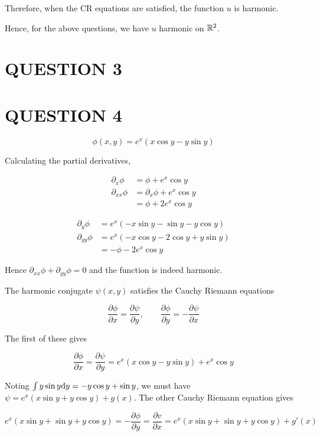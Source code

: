\documentclass[a4paper]{article}
\begin{document}
Therefore, when the CR equations are satisfied, the function $ u $ is harmonic.

Hence, for the above questions, we have $ u $ harmonic on $ \mathbb{R}^{2} $.


\section{QUESTION 3}
\section{QUESTION 4}

\[ \phi(x,y) = e^{x}(x \cos y - y \sin y) \]

Calculating the partial derivatives,

\begin{align*}
\partial_{x} \phi & = \phi + e^{x}\cos y \\
\partial_{xx} \phi & = \partial_{x} \phi +  e^{x}\cos y  \\
& = \phi + 2 e^{x}\cos y
\end{align*}



\begin{align*}
\partial_{y} \phi & = e^{x}(-x \sin y - \sin y - y \cos y) \\
\partial_{yy} \phi & = e^{x}(-x \cos y - 2\cos y + y \sin y ) \\
& = - \phi - 2 e^{x}\cos y
\end{align*}

Hence $ \partial_{xx} \phi + \partial_{yy} \phi = 0  $ and the function is indeed harmonic.

The harmonic conjugate $ \psi(x,y) $ satisfies the Cauchy Riemann equations

\[ \frac{\partial \phi }{\partial x} = \frac{\partial \psi }{\partial y}, \qquad  \frac{\partial \phi }{\partial y} = - \frac{\partial \psi }{\partial x} \]

The first of these gives 

\[ \frac{\partial \phi }{\partial x} = \frac{\partial \psi }{\partial y} = e^{x}(x \cos y - y \sin y) + e^{x}\cos y \]

Noting $ \int y \sin y \mathrm{d} y = - y \cos y + \sin y $, we must have $ \psi = e^{x}(x \sin y + y \cos y) + g(x) $. The other Cauchy Riemann equation gives

\[ e^{x}(x \sin y + \sin y + y \cos y) = - \frac{\partial \phi }{\partial y} = \frac{\partial v }{\partial x} = e^{x}(x \sin y + \sin y + y \cos y) + g'(x) \]
\end{document}
